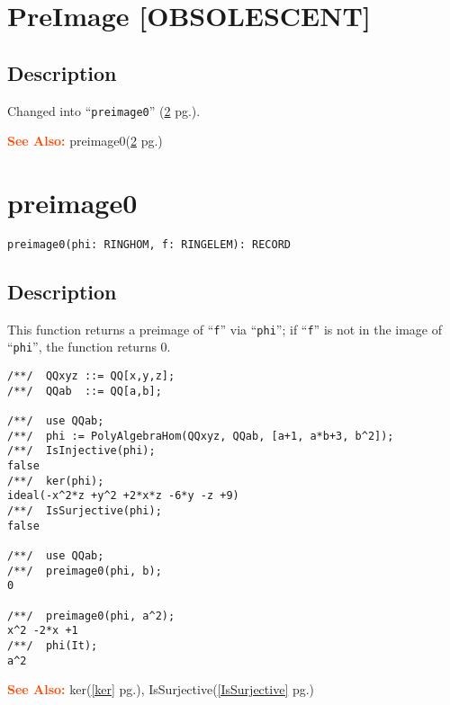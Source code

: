 \documentclass[a4paper]{mybook}
\newenvironment{command}{}{} %
\newcommand\SeeAlso{\par\textcolor{OrangeRed}{\textbf{\large See Also: }}}
\begin{document}
\section{PreImage [OBSOLESCENT]}
\label{PreImage [OBSOLESCENT]}
\begin{command} %



\subsection*{Description}

Changed into ``\verb&preimage0&'' (\ref{preimage0} pg.\pageref{preimage0}).

\SeeAlso %
  preimage0(\ref{preimage0} pg.\pageref{preimage0})
\end{command} %

\section{preimage0}
\label{preimage0}
\begin{command} %


\begin{Verbatim}[label=syntax, rulecolor=\color{MidnightBlue},
frame=single]
preimage0(phi: RINGHOM, f: RINGELEM): RECORD
\end{Verbatim}


\subsection*{Description}

This function returns a preimage of ``\verb&f&'' via ``\verb&phi&''; if ``\verb&f&'' is
not in the image of ``\verb&phi&'', the function returns 0.
\begin{Verbatim}[label=example, rulecolor=\color{PineGreen}, frame=single]
/**/  QQxyz ::= QQ[x,y,z];
/**/  QQab  ::= QQ[a,b];

/**/  use QQab;
/**/  phi := PolyAlgebraHom(QQxyz, QQab, [a+1, a*b+3, b^2]);
/**/  IsInjective(phi);
false
/**/  ker(phi);
ideal(-x^2*z +y^2 +2*x*z -6*y -z +9)
/**/  IsSurjective(phi);
false

/**/  use QQab;
/**/  preimage0(phi, b);
0

/**/  preimage0(phi, a^2);
x^2 -2*x +1
/**/  phi(It);
a^2
\end{Verbatim}


\SeeAlso %
  ker(\ref{ker} pg.\pageref{ker}), 
    IsSurjective(\ref{IsSurjective} pg.\pageref{IsSurjective})
\end{command} %
\end{document}
